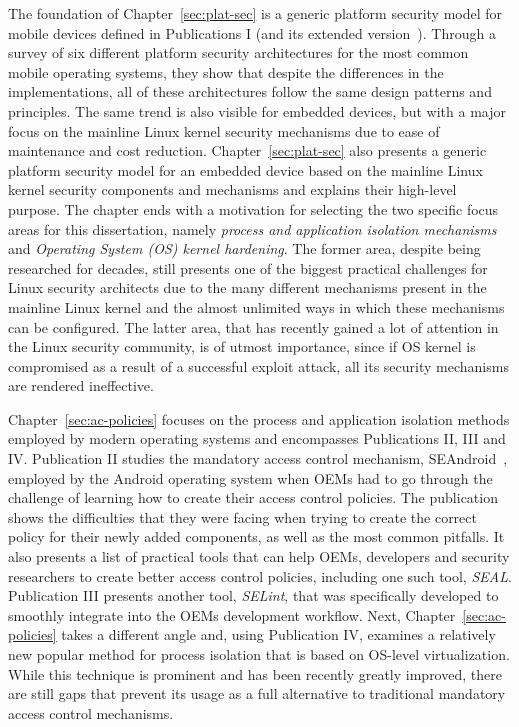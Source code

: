 The foundation of Chapter~\ref{sec:plat-sec} is a generic platform security model for mobile devices defined in Publications I (and its extended version~\cite{2013Asokan}). Through a survey of six different platform security architectures for the most common mobile operating systems, they show that despite the differences in the implementations, all of these architectures follow the same design patterns and principles. The same trend is also visible for embedded devices, but with a major focus on the mainline Linux kernel security mechanisms due to ease of maintenance and cost reduction. Chapter~\ref{sec:plat-sec} also presents a generic platform security model for an embedded device based on the mainline Linux kernel security components and mechanisms and explains their high-level purpose. The chapter ends with a motivation for selecting the two specific focus areas for this dissertation, namely \textit{process and application isolation mechanisms} and \textit{Operating System (OS) kernel hardening}. The former area, despite being researched for decades, still presents one of the biggest practical challenges for Linux security architects due to the many different mechanisms present in the mainline Linux kernel and the almost unlimited ways in which these mechanisms can be configured. The latter area, that has recently gained a lot of attention in the Linux security community, is of utmost importance, since if OS kernel is compromised as a result of a successful exploit attack, all its security mechanisms are rendered ineffective.

Chapter~\ref{sec:ac-policies} focuses on the process and application isolation methods employed by modern operating systems and encompasses Publications II, III and IV. Publication II studies the mandatory access control mechanism, SEAndroid~\cite{smalley12}, employed by the Android operating system when OEMs had to go through the challenge of learning how to create their access control policies. The publication shows the difficulties that they were facing when trying to create the correct policy for their newly added components, as well as the most common pitfalls. It also presents a list of practical tools that can help OEMs, developers and security researchers to create better access control policies, including one such tool, \textit{SEAL}. Publication III presents another tool, \textit{SELint}, that was specifically developed to smoothly integrate into the OEMs development workflow. Next, Chapter~\ref{sec:ac-policies} takes a different angle and, using Publication IV, examines a relatively new popular method for process isolation that is based on OS-level virtualization. While this technique is prominent and has been recently greatly improved, there are still gaps that prevent its usage as a full alternative to traditional mandatory access control mechanisms.

